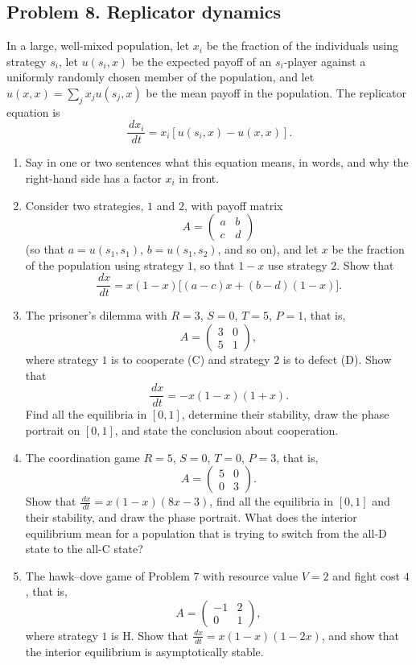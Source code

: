 \documentclass[a4paper,12pt]{article}
\newcommand{\dd}{\,d}
\begin{document}
\subsection*{Problem 8. Replicator dynamics}

In a large, well-mixed population, let $x_i$ be the fraction of the individuals using strategy $s_i$, let $u(s_i,x)$ be the expected payoff of an $s_i$-player against a uniformly randomly chosen member of the population, and let $u(x,x)=\sum_j x_j u(s_j,x)$ be the mean payoff in the population. The replicator equation is
\[ \frac{\dd x_i}{\dd t} = x_i\left[ u(s_i,x) - u(x,x) \right] . \]

\begin{enumerate}[label=(\alph*)]
\item Say in one or two sentences what this equation means, in words, and why the right-hand side has a factor $x_i$ in front.

\item Consider two strategies, $1$ and $2$, with payoff matrix
\[ A = \begin{pmatrix} a & b\\ c & d \end{pmatrix} \]
(so that $a=u(s_1,s_1)$, $b=u(s_1,s_2)$, and so on), and let $x$ be the fraction of the population using strategy $1$, so that $1-x$ use strategy $2$. Show that
\[ \frac{\dd x}{\dd t} = x(1-x)\Big[ (a-c)x + (b-d)(1-x) \Big] . \]

\item The prisoner's dilemma with $R=3$, $S=0$, $T=5$, $P=1$, that is,
\[ A = \begin{pmatrix} 3 & 0\\ 5 & 1 \end{pmatrix} , \]
where strategy $1$ is to cooperate (C) and strategy $2$ is to defect (D). Show that
\[ \frac{\dd x}{\dd t} = -x(1-x)(1+x) . \]
Find all the equilibria in $[0,1]$, determine their stability, draw the phase portrait on $[0,1]$, and state the conclusion about cooperation.

\item The coordination game $R=5$, $S=0$, $T=0$, $P=3$, that is,
\[ A = \begin{pmatrix} 5 & 0\\ 0 & 3 \end{pmatrix} . \]
Show that $\frac{\dd x}{\dd t} = x(1-x)(8x-3)$, find all the equilibria in $[0,1]$ and their stability, and draw the phase portrait. What does the interior equilibrium mean for a population that is trying to switch from the all-D state to the all-C state?

\item The hawk--dove game of Problem 7 with resource value $V=2$ and fight cost $4$, that is,
\[ A = \begin{pmatrix} -1 & 2\\ 0 & 1 \end{pmatrix} , \]
where strategy $1$ is H. Show that $\frac{\dd x}{\dd t} = x(1-x)(1-2x)$, and show that the interior equilibrium is asymptotically stable.

\end{enumerate}
\end{document}
